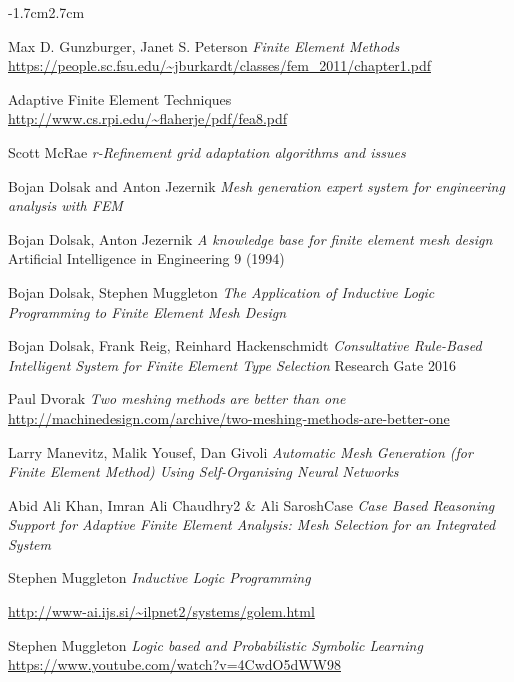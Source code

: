 \documentclass{article}
\newcommand{\CMwidth}{-1.7cm}
\newcommand{\CMheight}{2.7cm}
\begin{document}
\begin{changemargin}{\CMwidth}{\CMheight} 

\begin{thebibliography}{9}

 Max D. Gunzburger, Janet S. Peterson \emph{Finite Element Methods} \url{https://people.sc.fsu.edu/~jburkardt/classes/fem\_2011/chapter1.pdf}

 Adaptive Finite Element Techniques \url{http://www.cs.rpi.edu/~flaherje/pdf/fea8.pdf}

 Scott McRae \emph{r-Refinement grid adaptation algorithms and issues}

 Bojan Dolsak and Anton Jezernik \emph{Mesh generation expert system for engineering analysis with FEM}

 Bojan Dolsak, Anton Jezernik \emph{A knowledge base for finite element mesh design} Artificial Intelligence in Engineering 9 (1994)

 Bojan Dolsak, Stephen Muggleton \emph{The Application of Inductive Logic Programming to Finite Element Mesh Design}

 Bojan Dolsak, Frank Reig, Reinhard Hackenschmidt \emph{Consultative Rule-Based Intelligent System for Finite Element Type Selection} Research Gate 2016

 Paul Dvorak \emph{Two meshing methods are better than one} \url{http://machinedesign.com/archive/two-meshing-methods-are-better-one}

 Larry Manevitz, Malik Yousef, Dan Givoli \emph{Automatic Mesh Generation (for Finite Element Method) Using Self-Organising Neural Networks}

Abid Ali Khan, Imran Ali Chaudhry2 \& Ali SaroshCase \emph{Case Based Reasoning Support for Adaptive Finite Element Analysis: Mesh Selection for an Integrated System}

 Stephen Muggleton \emph{Inductive Logic Programming}

 \url{http://www-ai.ijs.si/~ilpnet2/systems/golem.html}

Stephen Muggleton \emph{Logic based and Probabilistic Symbolic Learning} \url{https://www.youtube.com/watch?v=4CwdO5dWW98}


\end{thebibliography}
\end{changemargin}
\end{document}
